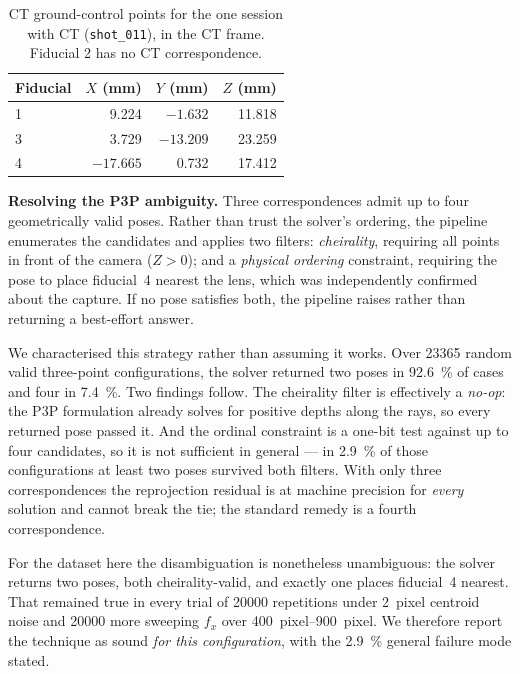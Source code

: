 \documentclass[journal,10pt]{IEEEtran}
\begin{document}
\begin{table}[t]
\centering
\caption{CT ground-control points for the one session with CT
(\texttt{shot\_011}), in the CT frame. Fiducial 2 has no CT correspondence.}
\label{tab:ct}
\footnotesize
\begin{tabular}{@{}lrrr@{}}
\toprule
\textbf{Fiducial} & $X$ (mm) & $Y$ (mm) & $Z$ (mm) \\
\midrule
1 & 9.224   & $-1.632$  & 11.818 \\
3 & 3.729   & $-13.209$ & 23.259 \\
4 & $-17.665$ & 0.732   & 17.412 \\
\bottomrule
\end{tabular}
\end{table}

\textbf{Resolving the P3P ambiguity.} Three correspondences admit up to four
geometrically valid poses. Rather than trust the solver's ordering, the pipeline
enumerates the candidates and applies two filters: \emph{cheirality}, requiring
all points in front of the camera ($Z>0$); and a \emph{physical ordering}
constraint, requiring the pose to place fiducial~4 nearest the lens, which was
independently confirmed about the capture. If no pose satisfies both, the
pipeline raises rather than returning a best-effort answer.

We characterised this strategy rather than assuming it works. Over
\num{23365} random valid three-point configurations, the solver returned two
poses in \SI{92.6}{\percent} of cases and four in \SI{7.4}{\percent}. Two
findings follow. The cheirality filter is effectively a \emph{no-op}: the P3P
formulation already solves for positive depths along the rays, so every returned
pose passed it. And the ordinal constraint is a one-bit test against up to four
candidates, so it is not sufficient in general --- in \SI{2.9}{\percent} of those
configurations at least two poses survived both filters. With only three
correspondences the reprojection residual is at machine precision for
\emph{every} solution and cannot break the tie; the standard remedy is a fourth
correspondence.

For the dataset here the disambiguation is nonetheless unambiguous: the solver
returns two poses, both cheirality-valid, and exactly one places fiducial~4
nearest. That remained true in every trial of \num{20000} repetitions under
\SI{2}{pixel} centroid noise and \num{20000} more sweeping $f_x$ over
\SIrange{400}{900}{pixel}. We therefore report the technique as sound
\emph{for this configuration}, with the \SI{2.9}{\percent} general failure mode
stated.
\end{document}
